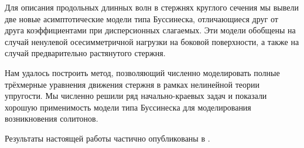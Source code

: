 \documentclass[12pt, a4paper]{article}
\begin{document}
Для описания продольных длинных волн в стержнях круглого сечения мы вывели две новые асимптотические модели типа Буссинеска, отличающиеся друг от друга коэффициентами при дисперсионных слагаемых. Эти модели обобщены на случай ненулевой осесимметричной нагрузки на боковой поверхности, а также на случай предварительно растянутого стержня.

Нам удалось построить метод, позволяющий численно моделировать полные трёхмерные уравнения движения стержня в рамках нелинейной теории упругости. Мы численно решили ряд начально-краевых задач и показали хорошую применимость модели типа Буссинеска для моделирования возникновения солитонов.

Результаты настоящей работы частично опубликованы в \cite{Garbuzov}.


\let\OLDthebibliography\thebibliography
\renewcommand\thebibliography[1]{
	\OLDthebibliography{#1}
	\setlength{\parskip}{0pt}
	\setlength{\itemsep}{0pt plus 0.3ex}
}
\end{document}
